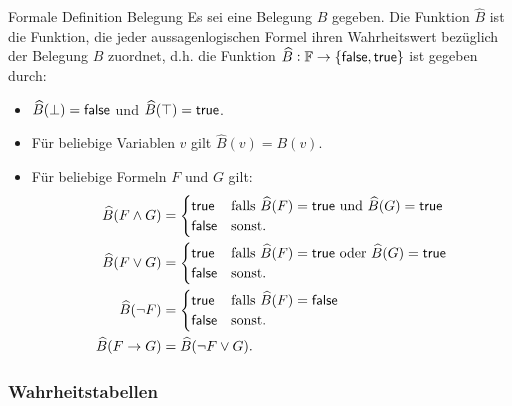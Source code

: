 \begin{definition}{Formale Definition Belegung}
Es sei eine Belegung $B$ gegeben. Die Funktion $\widehat{B}$ ist die Funktion, die jeder
aussagenlogischen Formel ihren Wahrheitswert bezüglich der Belegung $B$ zuordnet, d.h.
die Funktion $\widehat{B}:\mathbb{F}\to\{\mathsf{false},\mathsf{true}\}$ ist gegeben durch:
\begin{itemize}
\item $\widehat{B}(\bot) =\mathsf{false}$ und $\widehat{B}(\top)=\mathsf{true}$.
\item Für beliebige Variablen $v$ gilt $\widehat{B}(v)=B(v)$.
\item Für beliebige Formeln $F$ und $G$ gilt:
\begin{align}
\widehat{B}(F\land G)&=\begin{cases}
\mathsf{true} &\text{falls }\widehat{B}(F)=\mathsf{true}\text{ und }\widehat{B}(G)=\mathsf{true}\\
\mathsf{false}&\text{sonst.}
\end{cases}\\
\widehat{B}(F\lor G)&=\begin{cases}
\mathsf{true}&\text{falls }\widehat{B}(F)=\mathsf{true}\text{ oder }\widehat{B}(G)=\mathsf{true}\\
\mathsf{false}&\text{sonst.}
\end{cases}\\
\widehat{B}(\neg F)&=\begin{cases}
\mathsf{true}&\text{falls }\widehat{B}(F)=\mathsf{false} \\
\mathsf{false}&\text{sonst.}
\end{cases}\\
\widehat{B}(F\to G)&=\widehat{B}(\neg F\lor G).
\end{align}
\end{itemize}
\end{definition}

\subsubsection*{Wahrheitstabellen}
\begin{comment}
Um den Wahrheitswert einer Formel $F$ bezüglich einer Belegung $B$ zu bestimmen, gen\"ugt es die Werte $B(x)$ für alle Variablen $x$, die in $F$ vorkommen zu kennen. Da eine Formel immer nur eine endliche Anzahl an Variablen enthält, erlaubt uns dieser Umstand für jede Formel eine Tabelle aufstellen, die den Wahrheitsgehalt dieser Formel bezüglich jeder möglichen Belegung darstellt. Wir brauchen dazu den Begriff einer Teilformel.
\end{comment}

